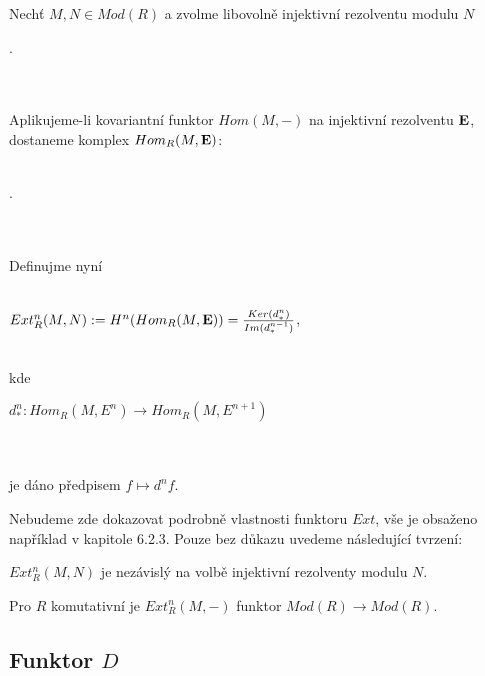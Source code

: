     \begin{dfn}
       Nechť $M,N\in Mod(R)$ a zvolme libovolně injektivní rezolventu modulu $N$\\
       \centerline{.}\\\\
      Aplikujeme-li kovariantní funktor $Hom(M,-)$ na injektivní rezolventu $\textbf 
      E$, dostaneme komplex $Hom_R(M,\textbf E)$:\\\\
       \centerline{.}\\\\
      Definujme nyní \\\\
      \centerline{$Ext^n_R(M,N):=H^n(Hom_R(M,\textbf E))=\frac{Ker(d_*^n)}{Im(d_*^{n-1})}$,}\\
      kde \\
      \centerline{$d_*^n:Hom_R(M,E^n)\rightarrow Hom_R(M,E^{n+1})$}\\\\
      je dáno předpisem $f\mapsto d^nf$.
     \end{dfn}
     
     Nebudeme zde dokazovat podrobně vlastnosti funktoru $Ext$, vše je obsaženo 
     například v \cite{5} kapitole 6.2.3.
     Pouze bez důkazu uvedeme následující tvrzení: 
     
     \begin{thm}
       \begin{description}
         \item 
         \item[(a)] $Ext^n_R(M,N)$ je nezávislý na volbě injektivní rezolventy 
           modulu $N$.
         \item[(b)] Pro $R$ komutativní je $Ext^n_R(M,-)$ funktor $Mod(R)\rightarrow 
           Mod(R)$.
       \end{description}
     \end{thm}

   \subsection{Funktor $D$}
     
